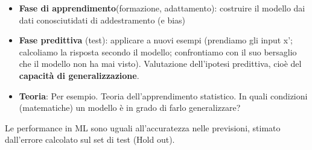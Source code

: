 \begin{itemize}
    \item \textbf{Fase di apprendimento}(formazione, adattamento): costruire il modello
    dai dati conosciutidati di addestramento (e bias)
    \item \textbf{Fase predittiva} (test): applicare a nuovi esempi (prendiamo gli input x’; calcoliamo la risposta secondo il modello; confrontiamo con il suo bersaglio che il modello non ha mai visto).
    Valutazione dell’ipotesi predittiva, cioè del \textbf{capacità di generalizzazione}.
    \item \textbf{Teoria}: Per esempio. Teoria dell'apprendimento statistico. In quali condizioni (matematiche) un modello è in grado di farlo generalizzare?
\end{itemize}
\begin{note}
    Le performance in ML sono uguali all'accuratezza nelle previsioni, stimato dall'errore calcolato sul set di test (Hold out).
\end{note}